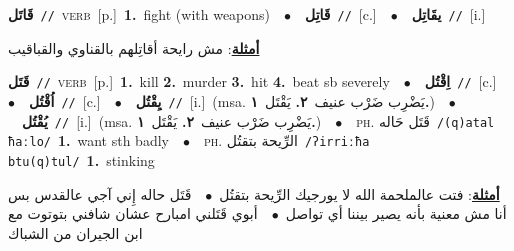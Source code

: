 \documentclass[10pt,a4paper,twoside]{article} %
\begin{document}
\begin{multicols}{2}
{\setlength\topsep{0pt}\textbf{\foreignlanguage{arabic}{قَاتَل}}\ {\color{gray}\texttt{//}\color{black}}\ \textsc{verb}\ [p.]\ \textbf{1.}~fight (with weapons)\ \ $\bullet$\ \ \setlength\topsep{0pt}\textbf{\foreignlanguage{arabic}{قَاتِل}}\ {\color{gray}\texttt{//}\color{black}}\ [c.]\ \ $\bullet$\ \ \setlength\topsep{0pt}\textbf{\foreignlanguage{arabic}{يقَاتِل}}\ {\color{gray}\texttt{//}\color{black}}\ [i.]\  \begin{flushright}\color{gray}\foreignlanguage{arabic}{\textbf{\underline{\foreignlanguage{arabic}{أمثلة}}}: مش رايحة أقاتِلهم بالقناوي والقباقيب}\end{flushright}\color{black}} \vspace{2mm}

{\setlength\topsep{0pt}\textbf{\foreignlanguage{arabic}{قَتَل}}\ {\color{gray}\texttt{//}\color{black}}\ \textsc{verb}\ [p.]\ \textbf{1.}~kill  \textbf{2.}~murder  \textbf{3.}~hit  \textbf{4.}~beat sb severely\ \ $\bullet$\ \ \setlength\topsep{0pt}\textbf{\foreignlanguage{arabic}{اِقْتُل}}\ {\color{gray}\texttt{//}\color{black}}\ [c.]\ \ $\bullet$\ \ \setlength\topsep{0pt}\textbf{\foreignlanguage{arabic}{اُقْتُل}}\ {\color{gray}\texttt{//}\color{black}}\ [c.]\ \ $\bullet$\ \ \setlength\topsep{0pt}\textbf{\foreignlanguage{arabic}{يِقْتُل}}\ {\color{gray}\texttt{//}\color{black}}\ [i.]\ \color{gray}(msa. \foreignlanguage{arabic}{يَضْرِب ضَرْب عنيف}~\foreignlanguage{arabic}{\textbf{٢.}}  \foreignlanguage{arabic}{يَقْتَل}~\foreignlanguage{arabic}{\textbf{١.}})\color{black}\ \ $\bullet$\ \ \setlength\topsep{0pt}\textbf{\foreignlanguage{arabic}{يُقْتُل}}\ {\color{gray}\texttt{//}\color{black}}\ [i.]\ \color{gray}(msa. \foreignlanguage{arabic}{يَضْرِب ضَرْب عنيف}~\foreignlanguage{arabic}{\textbf{٢.}}  \foreignlanguage{arabic}{يَقْتَل}~\foreignlanguage{arabic}{\textbf{١.}})\color{black}\ \ $\bullet$\ \ \textsc{ph.} \color{gray} \foreignlanguage{arabic}{قَتَل حَاله}\color{black}\ {\color{gray}\texttt{/{\sffamily (q)atal ħaːlo}/}\color{black}}\ \textbf{1.}~want sth badly\ \ $\bullet$\ \ \textsc{ph.} \color{gray} \foreignlanguage{arabic}{الرِّيحة بتقتُل}\color{black}\ {\color{gray}\texttt{/{\sffamily ʔirriːħa btu(q)tul}/}\color{black}}\ \textbf{1.}~stinking\  \begin{flushright}\color{gray}\foreignlanguage{arabic}{\textbf{\underline{\foreignlanguage{arabic}{أمثلة}}}: فتت عالملحمة الله لا يورجيك الرِّيحة بتقتُل\ $\bullet$\ \  قَتَل حاله إِني آجي عالقدس بس أنا مش معنية بأنه يصير بيننا أي تواصل\ $\bullet$\ \  أبوي قَتَلني امبارح عشان شافني بتوتوت مع ابن الجيران من الشباك}\end{flushright}\color{black}} \vspace{2mm}


\end{multicols}
\end{document}

